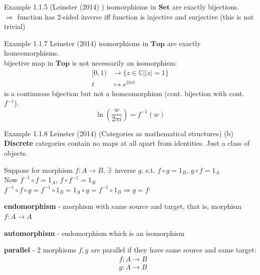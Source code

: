 Example 1.1.5 (Leinster (2014) \cite{agat:Lein2014}) isomorphisms in $\textbf{Set}$ are exactly bijections. \\
$\Longrightarrow $ function has 2-sided inverse iff function is injective and surjective (this is not trivial)

Example 1.1.7 Leinster (2014) \cite{agat:Lein2014} isomorphisms in $\textbf{Top}$ are exactly homeomorphisms. \\
bijective map in $\textbf{Top}$ is not necessarily an isomorphism:
\[
\begin{aligned}
	[0, 1) & \to \lbrace z \in \mathbb{C} | |z| = 1 \rbrace \\
	t & \mapsto e^{2\pi i t}
\end{aligned}
\]
is a continuous bijection but not a homeomorphism (cont. bijection with cont. $f^{-1}$). 
\[
\ln{ \left( \frac{w}{2\pi i} \right) } = f^{-1}(w)
\]

Example 1.1.8 Leinster (2014) \cite{agat:Lein2014} (Categories as mathematical structures) (b) \textbf{Discrete} categories contain no maps at all apart from identities. Just a class of objects.


Suppose for morphism $f: A \to B$, $\exists \,$ inverse $g$, s.t. $f\circ g = 1_B$, $g\circ f = 1_A$ \\
Now $f^{-1} \circ f = 1_A$, $f\circ f^{-1} = 1_B$ \\
\phantom{Now} $f^{-1} \circ f \circ g = f^{-1} \circ 1_B = 1_A \circ g = f^{-1} \circ 1_B \Longrightarrow g= f^{_1}$ 


\begin{definition}[endomorphism]
	\textbf{endomorphism} - morphism with same source and target, that is, morphism $f:A \to A$
\end{definition}

\begin{definition}[automorphism]
\textbf{automorphism} - endomorphism which is an isomorphism
\end{definition}

\begin{definition}[parallel]
	\textbf{parallel} - 2 morphisms $f,g$ are parallel if they have same source and same target:
	\[
	\begin{aligned}
	& f:A \to B \\
	& g:A \to B
	\end{aligned}
	\]
\end{definition}

